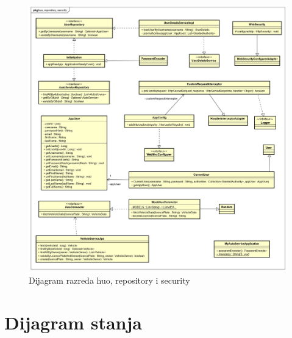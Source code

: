 		\begin{figure}[H]
			\centering
			\includegraphics[width=1.0\linewidth]{dijagrami/class_diagram_huo_repository_security.png}
			\caption{Dijagram razreda huo, repository i security}
			\label{fig:classdiagramhuorepositorysecurity}
		\end{figure}
		
			
			
			\eject
		
		\section{Dijagram stanja}
			
%			
%			
%			
			
